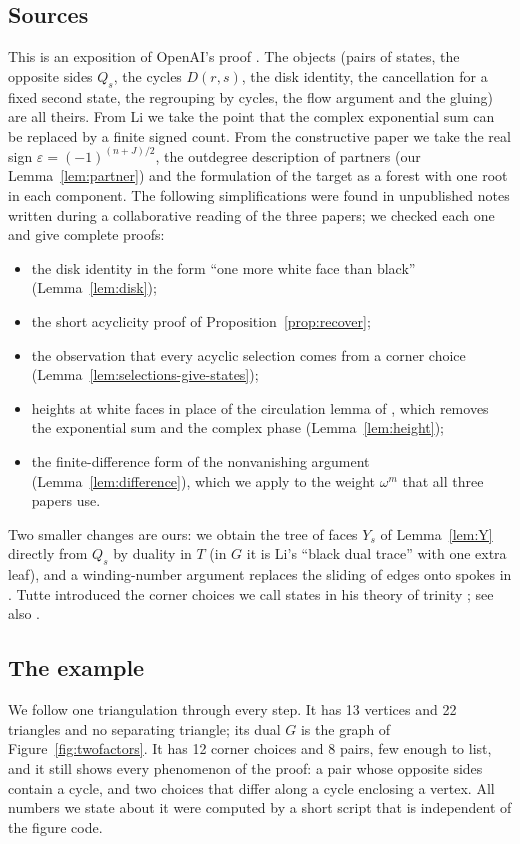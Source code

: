 \documentclass[10pt]{amsart}
\numberwithin{equation}{section}
\theoremstyle{definition}
\theoremstyle{remark}
\newcommand{\T}{T}
\newcommand{\eps}{\varepsilon}
\newcommand{\Dc}{D}
\begin{document}
\subsection*{Sources}
This is an exposition of OpenAI's proof \cite{openai2026}.
The objects (pairs of states, the opposite sides $Q_s$, the cycles $\Dc(r,s)$, the disk identity, the cancellation for a fixed second state, the regrouping by cycles, the flow argument and the gluing) are all theirs.
From Li \cite{li2026} we take the point that the complex exponential sum can be replaced by a finite signed count.
From the constructive paper \cite{constructive2026} we take the real sign $\eps=(-1)^{(n+J)/2}$, the outdegree description of partners (our Lemma~\ref{lem:partner}) and the formulation of the target as a forest with one root in each component.
The following simplifications were found in unpublished notes written during a collaborative reading of the three papers; we checked each one and give complete proofs:
\begin{itemize}
\item the disk identity in the form ``one more white face than black'' (Lemma~\ref{lem:disk});
\item the short acyclicity proof of Proposition~\ref{prop:recover};
\item the observation that every acyclic selection comes from a corner choice (Lemma~\ref{lem:selections-give-states});
\item heights at white faces in place of the circulation lemma of \cite{openai2026}, which removes the exponential sum and the complex phase (Lemma~\ref{lem:height});
\item the finite-difference form of the nonvanishing argument (Lemma~\ref{lem:difference}), which we apply to the weight $\omega^m$ that all three papers use.
\end{itemize}
Two smaller changes are ours: we obtain the tree of faces $Y_s$ of Lemma~\ref{lem:Y} directly from $Q_s$ by duality in $\T$ (in $G$ it is Li's ``black dual trace'' \cite[Section~6]{li2026} with one extra leaf), and a winding-number argument replaces the sliding of edges onto spokes in \cite[Section~5.3]{openai2026}.
Tutte introduced the corner choices we call states in his theory of trinity \cite{tutte1975}; see also \cite{hine-kalman2018}.

\subsection*{The example}
We follow one triangulation through every step.
It has 13 vertices and 22 triangles and no separating triangle; its dual $G$ is the graph of Figure~\ref{fig:twofactors}.
It has 12 corner choices and 8 pairs, few enough to list, and it still shows every phenomenon of the proof: a pair whose opposite sides contain a cycle, and two choices that differ along a cycle enclosing a vertex.
All numbers we state about it were computed by a short script that is independent of the figure code.
\end{document}
